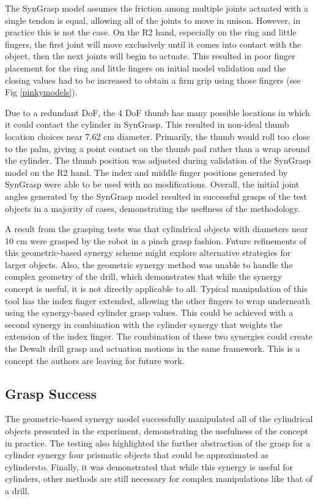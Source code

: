 \documentclass[runningheads,a4paper]{llncs}
\begin{document}
The SynGrasp model assumes the friction among multiple joints actuated with a single tendon is equal, allowing all of the joints to move in unison. However, in practice this is not the case. On the R2 hand, especially on the ring and little fingers, the first joint will move exclusively until it comes into contact with the object, then the next joints will begin to actuate. This resulted in poor finger placement for the ring and little fingers on initial model validation and the closing values had to be increased to obtain a firm grip using those fingers (see Fig \ref{pinkymodels}).

Due to a redundant DoF, the 4 DoF thumb has many possible locations in which it could contact the cylinder in SynGrasp. 
This resulted in non-ideal thumb location choices near 7.62 cm diameter. Primarily, the thumb would roll too close to the palm, giving a point contact on the thumb pad rather than a wrap around the cylinder. The thumb position was adjusted during validation of the SynGrasp model on the R2 hand. The index and middle finger positions generated by SynGrasp were able to be used with no modifications. Overall, the initial joint angles generated by the SynGrasp model resulted in successful grasps of the test objects in a majority of cases, demonstrating the useflness of the methodology. 

A result from the grasping tests was that cylindrical objects with diameters near 10 cm were grasped by the robot in a pinch grasp fashion. Future refinements of this geometric-based synergy scheme might explore alternative strategies for larger objects. Also, the geometric synergy method was unable to handle the complex geometry of the drill, which demonstrates that while the synergy concept is useful, it is not directly applicable to all. Typical manipulation of this tool has the index finger extended, allowing the other fingers to wrap underneath using the synergy-based cylinder grasp values. This could be achieved with a second synergy in combination with the cylinder synergy that weights the extension of the index finger. The combination of these two synergies could create the Dewalt drill grasp and actuation motions in the same framework. This is a concept the authors are leaving for future work. 

\subsection{Grasp Success}

The geometric-based synergy model successfully manipulated all of the cylindrical objects presented in the experiment, demonstrating the usefulness of the concept in practice. The testing also highlighted the further abstraction of the grasp for a cylinder synergy four prismatic objects that could be approximated as cylindersto. Finally, it was demonstrated that while this synergy is useful for cylinders, other methods are still necessary for complex manipulations like that of a drill.
\end{document}
